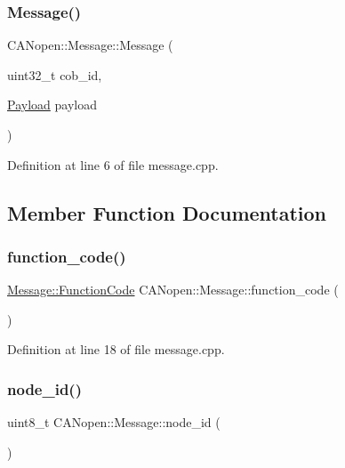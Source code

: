 \subsubsection{\texorpdfstring{Message()}{Message()}\hspace{0.1cm}{\footnotesize\ttfamily [3/3]}}
{\footnotesize\ttfamily C\+A\+Nopen\+::\+Message\+::\+Message (\begin{DoxyParamCaption}\item[{uint32\+\_\+t}]{cob\+\_\+id,  }\item[{\hyperlink{class_c_a_nopen_1_1_payload}{Payload}}]{payload }\end{DoxyParamCaption})}



Definition at line 6 of file message.\+cpp.



\subsection{Member Function Documentation}
\mbox{\label{class_c_a_nopen_1_1_message_a83d9901bbd77dcca9b44d68fd1e604b8}} 
\subsubsection{\texorpdfstring{function\+\_\+code()}{function\_code()}}
{\footnotesize\ttfamily \hyperlink{class_c_a_nopen_1_1_message_a0f8f95e4ea1284011cd122629edc5468}{Message\+::\+Function\+Code} C\+A\+Nopen\+::\+Message\+::function\+\_\+code (\begin{DoxyParamCaption}{ }\end{DoxyParamCaption})}



Definition at line 18 of file message.\+cpp.

\mbox{\label{class_c_a_nopen_1_1_message_a845fe0c7682bd6eeef0a5dd87b5e3c63}} 
\subsubsection{\texorpdfstring{node\+\_\+id()}{node\_id()}}
{\footnotesize\ttfamily uint8\+\_\+t C\+A\+Nopen\+::\+Message\+::node\+\_\+id (\begin{DoxyParamCaption}{ }\end{DoxyParamCaption})}



